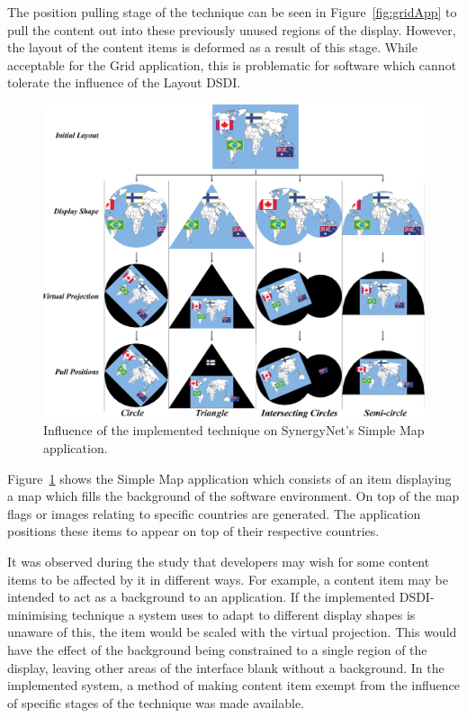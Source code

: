 \documentclass[review,5p,times,twocolumn]{elsarticle}
\begin{document}
The position pulling stage of the technique can be seen in Figure~\ref{fig:gridApp} to pull the content out into these previously unused regions of the display.
However, the layout of the content items is deformed as a result of this stage.
While acceptable for the Grid application, this is problematic for software which cannot tolerate the influence of the Layout \ac{DSDI}.

\begin{figure}[t!] 
	\centerline{\includegraphics[width=1\textwidth]{figures/map_app.png}}
	\caption{Influence of the implemented technique on SynergyNet's Simple Map application.}
	\label{fig:mapApp}
\end{figure}

Figure~\ref{fig:mapApp} shows the Simple Map application which consists of an item displaying a map which fills the background of the software environment.
On top of the map flags or images relating to specific countries are generated.
The application positions these items to appear on top of their respective countries.

It was observed during the study that developers may wish for some content items to be affected by it in different ways.
For example, a content item may be intended to act as a background to an application.
If the implemented \ac{DSDI}-minimising technique a system uses to adapt to different display shapes is unaware of this, the item would be scaled with the virtual projection.
This would have the effect of the background being constrained to a single region of the display, leaving other areas of the interface blank without a background.
In the implemented system, a method of making content item exempt from the influence of specific stages of the technique was made available.
\end{document}
